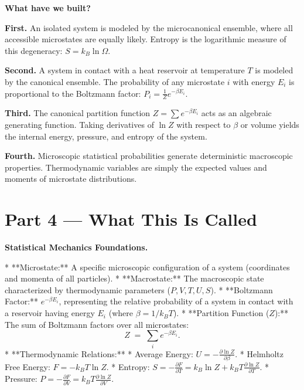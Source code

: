 \documentclass[12pt, a4paper, twoside]{book}
\begin{document}
\begin{discoverybox}
\textbf{What have we built?}

\textbf{First.} An isolated system is modeled by the microcanonical ensemble, where all accessible microstates are equally likely. Entropy is the logarithmic measure of this degeneracy: $S = k_B \ln \Omega$.

\textbf{Second.} A system in contact with a heat reservoir at temperature $T$ is modeled by the canonical ensemble. The probability of any microstate $i$ with energy $E_i$ is proportional to the Boltzmann factor: $P_i = \frac{1}{Z} e^{-\beta E_i}$.

\textbf{Third.} The canonical partition function $Z = \sum e^{-\beta E_i}$ acts as an algebraic generating function. Taking derivatives of $\ln Z$ with respect to $\beta$ or volume yields the internal energy, pressure, and entropy of the system.

\textbf{Fourth.} Microscopic statistical probabilities generate deterministic macroscopic properties. Thermodynamic variables are simply the expected values and moments of microstate distributions.
\end{discoverybox}

\newpage

\section{Part 4 --- What This Is Called}

\begin{namebox}
\textbf{Statistical Mechanics Foundations.}

* **Microstate:** A specific microscopic configuration of a system (coordinates and momenta of all particles).
* **Macrostate:** The macroscopic state characterized by thermodynamic parameters ($P, V, T, U, S$).
* **Boltzmann Factor:** $e^{-\beta E_i}$, representing the relative probability of a system in contact with a reservoir having energy $E_i$ (where $\beta = 1/k_B T$).
* **Partition Function ($Z$):** The sum of Boltzmann factors over all microstates:
  \[
    Z \;=\; \sum_i e^{-\beta E_i}.
  \]
* **Thermodynamic Relations:**
  * Average Energy: $U = -\frac{\partial \ln Z}{\partial \beta}$.
  * Helmholtz Free Energy: $F = -k_B T \ln Z$.
  * Entropy: $S = -\frac{\partial F}{\partial T} = k_B \ln Z + k_B T \frac{\partial \ln Z}{\partial T}$.
  * Pressure: $P = -\frac{\partial F}{\partial V} = k_B T \frac{\partial \ln Z}{\partial V}$.
\end{namebox}
\end{document}
